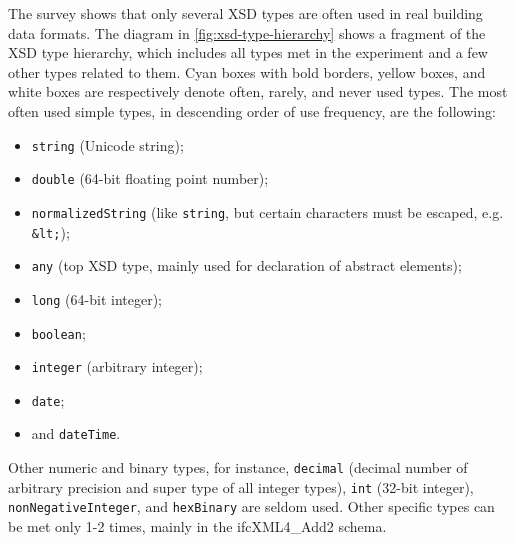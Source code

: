 











The survey shows that only several XSD types are often used in real building data formats.
The diagram in \autoref{fig:xsd-type-hierarchy} shows a fragment of the XSD type hierarchy, which includes all types met in the experiment and a few other types related to them.
Cyan boxes with bold borders, yellow boxes, and white boxes are respectively denote often, rarely, and never used types.
The most often used simple types, in descending order of use frequency, are the following:
\begin{itemize}
    \item \texttt{string} (Unicode string);
    \item \texttt{double} (64-bit floating point number);
    \item \texttt{normalizedString} (like \texttt{string}, but certain characters must be escaped, e.g. \texttt{\&lt;});
    \item \texttt{any} (top XSD type, mainly used for declaration of abstract elements);
    \item \texttt{long} (64-bit integer);
    \item \texttt{boolean};
    \item \texttt{integer} (arbitrary integer);
    \item \texttt{date};
    \item and \texttt{dateTime}.
\end{itemize}
Other numeric and binary types, for instance, \texttt{decimal} (decimal number of arbitrary precision and super type of all integer types), \texttt{int} (32-bit integer), \texttt{nonNegativeInteger}, and \texttt{hexBinary} are seldom used.
Other specific types can be met only 1-2 times, mainly in the ifcXML4\_Add2 schema.


